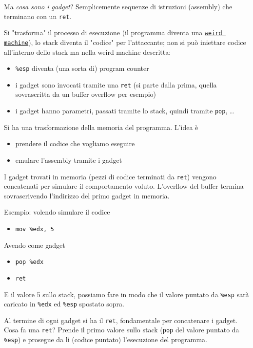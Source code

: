 Ma \textit{cosa sono i gadget}? Semplicemente sequenze di istruzioni (assembly) che terminano con un \texttt{ret}. 

Si "trasforma" il processo di esecuzione (il programma diventa una \href{https://en.wikipedia.org/wiki/Weird_machine}{\texttt{weird machine}}), lo stack diventa il "codice" per l'attaccante; non si può iniettare codice all'interno dello stack ma nella weird machine descritta:
\begin{itemize}
	\item \texttt{\%esp} diventa (una sorta di) program counter
    
	\item i gadget sono invocati tramite una \texttt{ret} (si parte dalla prima, quella sovrascritta da un buffer overflow per esempio)
	
    \item i gadget hanno parametri, passati tramite lo stack, quindi tramite \texttt{pop}, \dots 
\end{itemize}

Si ha una trasformazione della memoria del programma. L'idea è
\begin{itemize}
	\item prendere il codice che vogliamo eseguire
	
    \item emulare l'assembly tramite i gadget
\end{itemize}

I gadget trovati in memoria (pezzi di codice terminati da \texttt{ret}) vengono concatenati per simulare il comportamento voluto. L'overflow del buffer termina sovrascrivendo l'indirizzo del primo gadget in memoria. 

Esempio: volendo simulare il codice
\begin{itemize}[label*=]
	\item \texttt{mov \%edx, 5}
\end{itemize}

Avendo come gadget
\begin{itemize}[label*=, noitemsep]
	\item \texttt{pop \%edx}
	\item \texttt{ret}
\end{itemize}

E il valore 5 sullo stack, possiamo fare in modo che il valore puntato da \texttt{\%esp} sarà caricato in \texttt{\%edx} ed \texttt{\%esp} spostato sopra. 

Al termine di ogni gadget si ha il \texttt{ret}, fondamentale per concatenare i gadget. Cosa fa una \texttt{ret}? Prende il primo valore sullo stack (\texttt{pop} del valore puntato da \texttt{\%esp}) e prosegue da lì (codice puntato) l'esecuzione del programma.

